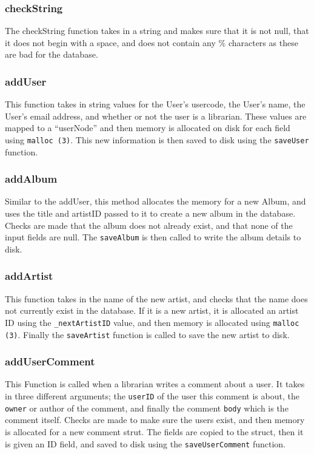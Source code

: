 \documentclass{article}
\begin{document}
\subsubsection*{checkString}
 The checkString function takes in a string and makes sure that it is not null, that it does not begin with a space,  and does not contain any \% characters as these are bad for the database.

\subsubsection*{addUser}
This function takes in string values for the User's usercode, the User's name, the User's email address, and whether or not the user is a librarian.  These values are mapped to a ``userNode'' and then memory is allocated on disk for each field using \verb|malloc (3)|. This new information is then saved to disk using the \verb|saveUser| function.

\subsubsection*{addAlbum}
Similar to the addUser, this method allocates the memory for a new Album, and uses the title and artistID passed to it to create a new album in the database. Checks are made that the album does not already exist, and that none of the input fields are null. The \verb|saveAlbum| is then called to write the album details to disk.

\subsubsection*{addArtist}
This function takes in the name of the new artist, and checks that the name does not currently exist in the database. If it is a new artist, it is allocated an artist ID using the \verb|_nextArtistID| value, and then memory is allocated using \verb|malloc (3)|. Finally the \verb|saveArtist| function is called to save the new artist to disk.

\subsubsection*{addUserComment}
This Function is called when a librarian writes a comment about a user. It takes in three different arguments; the \verb|userID| of the user this comment is about, the \verb|owner| or author of the comment, and finally the comment \verb|body| which is the comment itself. Checks are made to make sure the users exist, and then memory is allocated for a new comment strut. The fields are copied to the struct, then it is given an ID field, and saved to disk using the \verb|saveUserComment| function.
\end{document}

